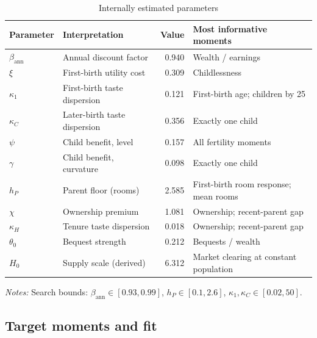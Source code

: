 \begin{table}[H]
\centering
\caption{Internally estimated parameters}
\label{tab:quant-parameters-oct06}
\small
\begin{tabularx}{\textwidth}{@{}l X r X@{}}
\toprule
Parameter & Interpretation & Value & Most informative moments \\
\midrule
$\beta_{\text{ann}}$ & Annual discount factor & 0.940 & Wealth / earnings \\
$\xi$ & First-birth utility cost & 0.309 & Childlessness \\
$\kappa_1$ & First-birth taste dispersion & 0.121 & First-birth age; children by 25 \\
$\kappa_C$ & Later-birth taste dispersion & 0.356 & Exactly one child \\
$\psi$ & Child benefit, level & 0.157 & All fertility moments \\
$\gamma$ & Child benefit, curvature & 0.098 & Exactly one child \\
$h_P$ & Parent floor (rooms) & 2.585 & First-birth room response; mean rooms \\
$\chi$ & Ownership premium & 1.081 & Ownership; recent-parent gap \\
$\kappa_H$ & Tenure taste dispersion & 0.018 & Ownership; recent-parent gap \\
$\theta_0$ & Bequest strength & 0.212 & Bequests / wealth \\
\addlinespace
$H_0$ & Supply scale (derived) & 6.312 & Market clearing at constant population \\
\bottomrule
\end{tabularx}
\par\smallskip
\begin{minipage}{0.95\linewidth}
\footnotesize\textit{Notes:} Search bounds: $\beta_{\text{ann}}\in[0.93,0.99]$,
$h_P\in[0.1,2.6]$, $\kappa_1,\kappa_C\in[0.02,50]$.
\end{minipage}
\end{table}

\subsection{Target moments and fit}

